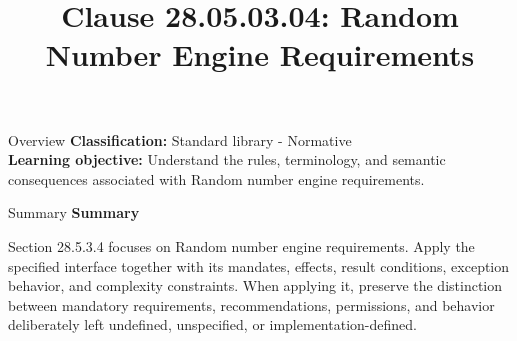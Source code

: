 \documentclass[10pt,letterpaper]{article}
\title{Clause 28.05.03.04: Random Number Engine Requirements}
\author{}
\date{}
\begin{document}
\maketitle
\begin{CornellOverviewBox}{Overview}
\textbf{Classification:} Standard library - Normative\\[2pt]
\textbf{Learning objective:} Understand the rules, terminology, and semantic consequences associated with Random number engine requirements.
\end{CornellOverviewBox}\begin{CornellSummaryBox}{Summary}
{\sffamily\bfseries\color{Accent} Summary}\par\vspace{3pt}Section 28.5.3.4 focuses on Random number engine requirements. Apply the specified interface together with its mandates, effects, result conditions, exception behavior, and complexity constraints. When applying it, preserve the distinction between mandatory requirements, recommendations, permissions, and behavior deliberately left undefined, unspecified, or implementation-defined.
\end{CornellSummaryBox}
\end{document}
